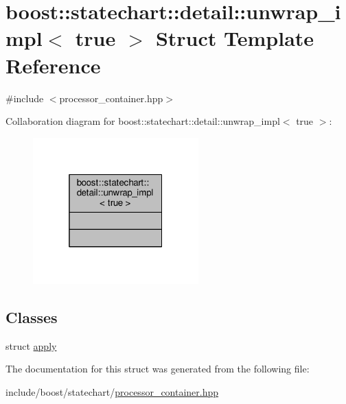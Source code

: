 \hypertarget{structboost_1_1statechart_1_1detail_1_1unwrap__impl_3_01true_01_4}{}\section{boost\+:\+:statechart\+:\+:detail\+:\+:unwrap\+\_\+impl$<$ true $>$ Struct Template Reference}
\label{structboost_1_1statechart_1_1detail_1_1unwrap__impl_3_01true_01_4}


{\ttfamily \#include $<$processor\+\_\+container.\+hpp$>$}



Collaboration diagram for boost\+:\+:statechart\+:\+:detail\+:\+:unwrap\+\_\+impl$<$ true $>$\+:
\nopagebreak
\begin{figure}[H]
\begin{center}
\leavevmode
\includegraphics[width=181pt]{structboost_1_1statechart_1_1detail_1_1unwrap__impl_3_01true_01_4__coll__graph}
\end{center}
\end{figure}
\subsection*{Classes}
\begin{DoxyCompactItemize}
\item 
struct \mbox{\hyperlink{structboost_1_1statechart_1_1detail_1_1unwrap__impl_3_01true_01_4_1_1apply}{apply}}
\end{DoxyCompactItemize}


The documentation for this struct was generated from the following file\+:\begin{DoxyCompactItemize}
\item 
include/boost/statechart/\mbox{\hyperlink{processor__container_8hpp}{processor\+\_\+container.\+hpp}}\end{DoxyCompactItemize}
